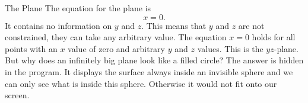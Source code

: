 \begin{surferPage}[Plane]{The Plane}
The equation for the plane is \[x=0.\] It contains no information on $y$ and $z$. This means that $y$ and $z$ are not constrained, they can take any arbitrary value.
The equation $x=0$ holds for all points with an $x$ value of zero and arbitrary $y$ and $z$ values. This is the $yz$-plane.
\newline \newline
But why does an infinitely big plane look like a filled circle? The answer is hidden in the program. It displays the surface always inside an invisible sphere and we can only see what is inside this sphere. Otherwise it would not fit onto our screen.
\end{surferPage}
